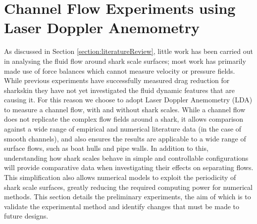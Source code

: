 \documentclass[12pt,oneside,a4paper]{article}
\begin{document}
\section{Channel Flow Experiments using Laser Doppler Anemometry}
As discussed in Section \ref{section:literatureReview}, little work has been carried out in analysing the fluid flow around shark scale surfaces; most work has primarily made use of force balances which cannot measure velocity or pressure fields. While previous experiments have successfully measured drag reduction for sharkskin they have not yet investigated the fluid dynamic features that are causing it. For this reason we choose to adopt Laser Doppler Anemometry (LDA) to measure a channel flow, with and without shark scales. While a channel flow does not replicate the complex flow fields around a shark, it allows comparison against a wide range of empirical and numerical literature data (in the case of smooth channels), and also ensures the results are applicable to a wide range of surface flows, such as boat hulls and pipe walls. In addition to this, understanding how shark scales behave in simple and controllable configurations will provide comparative data when investigating their effects on separating flows. This simplification also allows numerical models to exploit the periodicity of shark scale surfaces, greatly reducing the required computing power for numerical methods. This section details the preliminary experiments, the aim of which is to validate the experimental method and identify changes that must be made to future designs.
\end{document}
